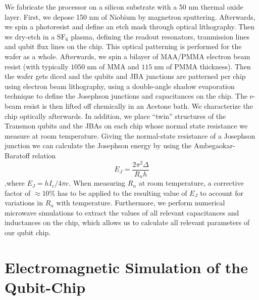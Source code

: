 We fabricate the processor on a silicon substrate with a 50 nm thermal oxide layer. First, we depose 150 nm of Niobium by magnetron sputtering. Afterwards, we spin a photoresist and define an etch mask through optical lithography. Then we dry-etch in a $\mathrm{SF}_6$ plasma, defining the readout resonators, tranmission lines and qubit flux lines on the chip. This optical patterning is performed for the wafer as a whole. Afterwards, we spin a bilayer of MAA/PMMA electron beam resist (with typically $1050\;\mathrm{nm}$ of MMA and $115\;\mathrm{nm}$ of PMMA thickness). Then the wafer gets diced and the qubits and JBA junctions are patterned per chip using electron beam lithography, using a double-angle shadow evaporation technique to define the Josephson junctions and capacitances on the chip. The e-beam resist is then lifted off chemically in an Acetone bath. We characterize the chip optically afterwards. In addition, we place ``twin'' structures of the Transmon qubits and the JBAs on each chip whose normal state resistance we measure at room temperature. Giving the normal-state resistance of a Josephson junction we can calculate the Josephson energy by using the Ambegaokar-Baratoff relation
%
\begin{equation}
E_J = \frac{2\pi^2 \Delta}{R_n h}
\end{equation}
%
,where $E_J = h I_c / 4\pi e$. When measuring $R_n$ at room temperature, a corrective factor of $\approx 10\%$ has to be applied to the resulting value of $E_J$ to account for variations in $R_n$ with temperature. Furthermore, we perform numerical microwave simulations to extract the values of all relevant capacitances and inductances on the chip, which allows us to calculate all relevant parameters of our qubit chip.

\section{Electromagnetic Simulation of the Qubit-Chip}

